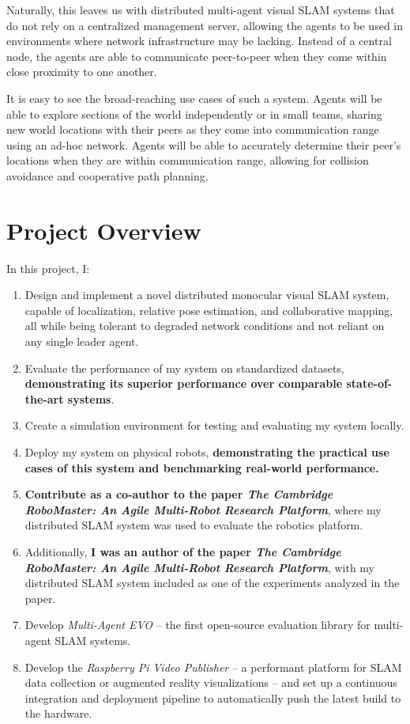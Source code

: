 Naturally, this leaves us with distributed multi-agent visual SLAM systems that do not rely on a centralized management server, allowing the agents to be used in environments where network infrastructure may be lacking. Instead of a central node, the agents are able to communicate peer-to-peer when they come within close proximity to one another.

It is easy to see the broad-reaching use cases of such a system. Agents will be able to explore sections of the world independently or in small teams, sharing new world locations with their peers as they come into communication range using an ad-hoc network. Agents will be able to accurately determine their peer's locations when they are within communication range, allowing for collision avoidance and cooperative path planning.

\section{Project Overview}
\label{sec:project-overview}
In this project, I: \noparskip
{
    \begin{enumerate}
        \item Design and implement a novel distributed monocular visual SLAM system, capable of localization, relative pose estimation, and collaborative mapping, all while being tolerant to degraded network conditions and not reliant on any single leader agent.
        \item Evaluate the performance of my system on standardized datasets, \textbf{demonstrating its superior performance over comparable state-of-the-art systems}.
        \item Create a simulation environment for testing and evaluating my system locally.
        \item Deploy my system on physical robots, \textbf{demonstrating the practical use cases of this system and benchmarking real-world performance.}
        \item \textbf{Contribute as a co-author to the paper \textit{The Cambridge RoboMaster: An Agile Multi-Robot Research Platform}}, where my distributed SLAM system was used to evaluate the robotics platform.
        \item Additionally, \textbf{I was an author of the paper \textit{The Cambridge RoboMaster: An Agile Multi-Robot Research Platform}}, with my distributed SLAM system included as one of the experiments analyzed in the paper.
        \item Develop \textit{Multi-Agent EVO} – the first open-source evaluation library for multi-agent SLAM systems.
        \item Develop the \textit{Raspberry Pi Video Publisher} – a performant platform for SLAM data collection or augmented reality visualizations – and set up a continuous integration and deployment pipeline to automatically push the latest build to the hardware.
    \end{enumerate}
}

